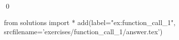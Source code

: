 \begin{ex}
  \label{ex:function_call_1}
  
  \mbox{}\\ \\
  \qed
\end{ex}
\begin{python0}
from solutions import *
add(label="ex:function_call_1",
    srcfilename='exercises/function_call_1/answer.tex') 
\end{python0}                              
